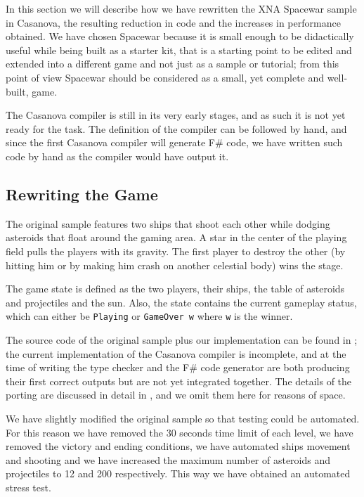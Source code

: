 
In this section we will describe how we have rewritten the XNA Spacewar \cite{XNA_SAMPLES} sample in Casanova, the resulting reduction in code and the increases in performance obtained. We have chosen Spacewar because it is small enough to be didactically useful while being built as a starter kit, that is a starting point to be edited and extended into a different game and not just as a sample or tutorial; from this point of view Spacewar should be considered as a small, yet complete and well-built, game.

The Casanova compiler is still in its very early stages, and as such it is not yet ready for the task. The definition of the compiler can be followed by hand, and since the first Casanova compiler will generate F\# code, we have written such code by hand as the compiler would have output it.

\subsection{Rewriting the Game}
The original sample features two ships that shoot each other while dodging asteroids that float around the gaming area. A star in the center of the playing field pulls the players with its gravity. The first player to destroy the other (by hitting him or by making him crash on another celestial body) wins the stage.

The game state is defined as the two players, their ships, the table of asteroids and projectiles and the sun. Also, the state contains the current gameplay status, which can either be \texttt{Playing} or \texttt{GameOver w} where \texttt{w} is the winner.

The source code of the original sample plus our implementation can be found in \cite{CASANOVA_CODEPLEX}; the current implementation of the Casanova compiler is incomplete, and at the time of writing the type checker and the F\# code generator are both producing their first correct outputs but are not yet integrated together. The details of the porting are discussed in detail in \cite{CASANOVA_TR}, and we omit them here for reasons of space.

We have slightly modified the original sample so that testing could be automated. For this reason we have removed the 30 seconds time limit of each level, we have removed the victory and ending conditions, we have automated ships movement and shooting and we have increased the maximum number of asteroids and projectiles to 12 and 200 respectively. This way we have obtained an automated stress test.

